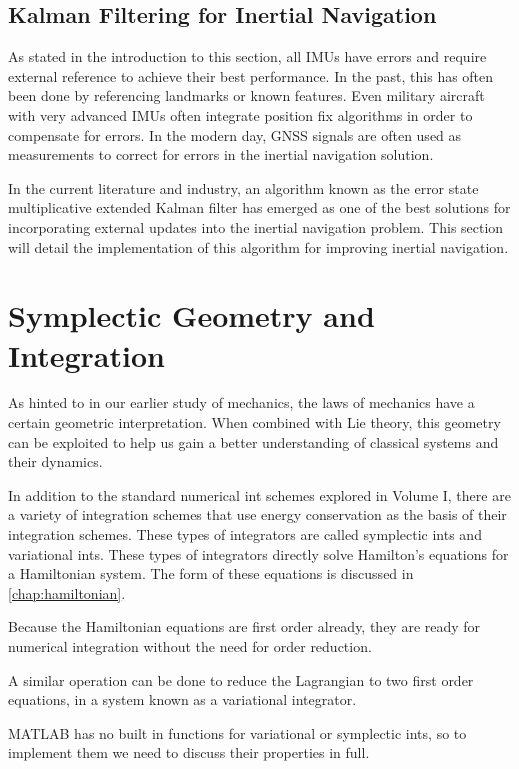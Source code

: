 \subsection{Kalman Filtering for Inertial Navigation}
As stated in the introduction to this section, all IMUs have errors and require external reference to achieve their best performance. In the past, this has often been done by referencing landmarks or known features. Even military aircraft with very advanced IMUs often integrate position fix algorithms in order to compensate for errors. In the modern day, GNSS signals are often used as measurements to correct for errors in the inertial navigation solution.

In the current literature and industry, an algorithm known as the error state multiplicative extended Kalman filter has emerged as one of the best solutions for incorporating external updates into the inertial navigation problem. This section will detail the implementation of this algorithm for improving inertial navigation.


\section{Symplectic Geometry and Integration}\label{sec: Syplectic Ints}

As hinted to in our earlier study of mechanics, the laws of mechanics have a certain geometric interpretation. When combined with Lie theory, this geometry can be exploited to help us gain a better understanding of classical systems and their dynamics.

In addition to the standard \gls{numerical int} schemes explored in Volume I, there are a variety of integration schemes that use energy conservation as the basis of their integration schemes. These types of integrators are called \glspl{symplectic int} and \glspl{variational int}. These types of integrators directly solve Hamilton's equations for a \gls{Hamiltonian} system. The form of these equations is discussed in \autoref{chap:hamiltonian}.

Because the \gls{Hamiltonian} equations are first order already, they are ready for numerical integration without the need for order reduction.

A similar operation can be done to reduce the \gls{Lagrangian} to two first order equations, in a system known as a variational integrator.

MATLAB has no built in functions for variational or \glspl{symplectic int}, so to implement them we need to discuss their properties in full. 


